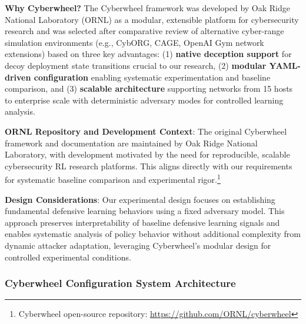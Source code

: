 \documentclass[12pt,oneside]{article}
\begin{document}
\textbf{Why Cyberwheel?} The Cyberwheel framework was developed by Oak Ridge National Laboratory (ORNL) as a modular, extensible platform for cybersecurity research and was selected after comparative review of alternative cyber-range simulation environments (e.g., CybORG, CAGE, OpenAI Gym network extensions) based on three key advantages: (1) \textbf{native deception support} for decoy deployment state transitions crucial to our research, (2) \textbf{modular YAML-driven configuration} enabling systematic experimentation and baseline comparison, and (3) \textbf{scalable architecture} supporting networks from 15 hosts to enterprise scale with deterministic adversary modes for controlled learning analysis.

\textbf{ORNL Repository and Development Context}: The original Cyberwheel framework and documentation are maintained by Oak Ridge National Laboratory, with development motivated by the need for reproducible, scalable cybersecurity RL research platforms. This aligns directly with our requirements for systematic baseline comparison and experimental rigor.\footnote{Cyberwheel open-source repository: \url{https://github.com/ORNL/cyberwheel}}

\textbf{Design Considerations}: Our experimental design focuses on establishing fundamental defensive learning behaviors using a fixed adversary model. This approach preserves interpretability of baseline defensive learning signals and enables systematic analysis of policy behavior without additional complexity from dynamic attacker adaptation, leveraging Cyberwheel's modular design for controlled experimental conditions.

\subsubsection{Cyberwheel Configuration System Architecture}
\end{document}
